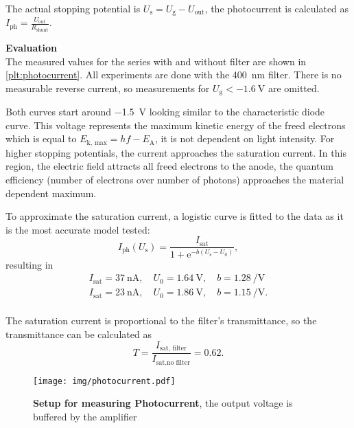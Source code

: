 The actual stopping potential is $U_\text{s} = U_\text{g} - U_\text{out}$, the photocurrent is calculated as $I_\text{ph} = \frac{U_\text{out}}{R_\text{shunt}}$.

\textbf{Evaluation}\\
The measured values for the series with and without filter are shown in \autoref{plt:photocurrent}.
All experiments are done with the \SI{400}{\nm} filter.
There is no measurable reverse current, so measurements for $U_\text{g} < \SI{-1.6}{\volt}$ are omitted.

Both curves start around \SI{-1.5}{\volt} looking similar to the characteristic diode curve.
This voltage represents the maximum kinetic energy of the freed electrons which is equal to $E_\text{k, max} = hf - E_\text{A}$, it is not dependent on light intensity.
For higher stopping potentials, the current approaches the saturation current.
In this region, the electric field attracts all freed electrons to the anode, the quantum efficiency (number of electrons over number of photons) approaches the material dependent maximum.

To approximate the saturation current, a logistic curve is fitted to the data as it is the most accurate model tested:
\begin{equation*}
	I_\text{ph}(U_\text{s}) = \frac{I_\text{sat}}{1 + \mathrm{e}^{-b (U_\text{s} - U_0)}},
\end{equation*}
resulting in
\begin{gather*}
	I_\text{sat} = \SI{37}{\nA}, \quad U_0 = \SI{1.64}{\volt}, \quad b = \SI{1.28}{\per\volt} \tag{no filter}\\
	I_\text{sat} = \SI{23}{\nA}, \quad U_0 = \SI{1.86}{\volt}, \quad b = \SI{1.15}{\per\volt}. \tag{filter}\\
\end{gather*}

The saturation current is proportional to the filter's transmittance, so the transmittance can be calculated as
\begin{equation*}
	T = \frac{I_\text{sat, filter}}{I_\text{sat,no filter}} = \num{0.62}.
\end{equation*}

\begin{figure}[tbp]
	\centering
	\texttt{[image: img/photocurrent.pdf]}
	\caption[Setup for measuring Photocurrent]{\textbf{Setup for measuring Photocurrent}, the output voltage is buffered by the amplifier}
	\label{sch:photocurrent}
\end{figure}

